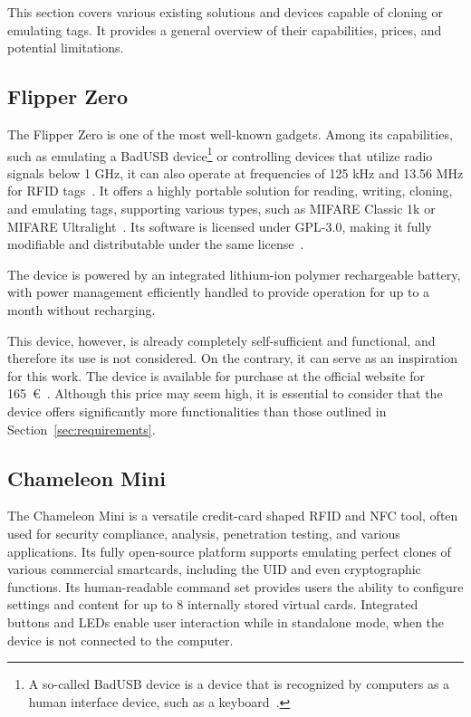 This section covers various existing solutions and devices capable of cloning or emulating tags. It provides a general overview of their capabilities, prices, and potential limitations.

\subsection{Flipper Zero}

The Flipper Zero is one of the most well-known gadgets. Among its capabilities, such as emulating a BadUSB device\footnote{A so-called BadUSB device is a device that is recognized by computers as a human interface device, such as a keyboard~\cite{badusb}.} or controlling devices that utilize radio signals below 1 GHz, it can also operate at frequencies of 125 kHz and 13.56 MHz for RFID tags~\cite{flipper}. It offers a highly portable solution for reading, writing, cloning, and emulating tags, supporting various types, such as MIFARE Classic 1k or MIFARE Ultralight~\cite{flipperreading}.  Its software is licensed under GPL-3.0, making it fully modifiable and distributable under the same license~\cite{githubflipper}.

The device is powered by an integrated lithium-ion polymer rechargeable battery, with power management efficiently handled to provide operation for up to a month without recharging.~\cite{flipperpower}

This device, however, is already completely self-sufficient and functional, and therefore its use is not considered. On the contrary, it can serve as an inspiration for this work. The device is available for purchase at the official website for 165~€~\cite{flippershop}. Although this price may seem high, it is essential to consider that the device offers significantly more functionalities than those outlined in Section~\ref{sec:requirements}.


\subsection{Chameleon Mini}

The Chameleon Mini is a versatile credit-card shaped RFID and NFC tool, often used for security compliance, analysis, penetration testing, and various applications. Its fully open-source platform supports emulating perfect clones of various commercial smartcards, including the UID and even cryptographic functions. Its human-readable command set provides users the ability to configure settings and content for up to 8 internally stored virtual cards. Integrated buttons and LEDs enable user interaction while in standalone mode, when the device is not connected to the computer.~\cite{chameleonwiki}

